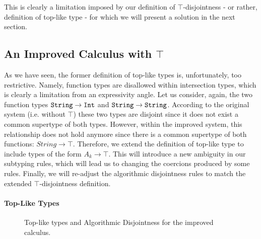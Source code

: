This is clearly a limitation imposed by our definition of $\top$-disjointness - or rather, definition of top-like type - 
for which we will present a solution in the next section.

\subsection{An Improved Calculus with $\top$}

As we have seen, the former definition of top-like types is, unfortunately, too restrictive.
Namely, function types are disallowed within intersection types, which is clearly a limitation from an expressivity
angle.
Let us consider, again, the two function types $\texttt{String} \to \texttt{Int}$ and $\texttt{String} \to \texttt{String}$. 
According to the original system (i.e. without $\top$) these two types are disjoint since it does not exist
a common supertype of both types. 
However, within the improved system, this relationship does not hold anymore since there is a common supertype of both
functions: $String \to \top$.
Therefore, we extend the definition of top-like type to include types of the form $A_k \to \top$.
This will introduce a new ambiguity in our subtyping rules, which will lead us to changing the coercions produced by some
rules.
Finally, we will re-adjust the algorithmic disjointness rules to match the extended $\top$-disjointness definition. 

\paragraph{Top-Like Types}

\begin{figure}[h]


  \caption{Top-like types and Algorithmic Disjointness for the improved calculus.}
  \label{fig:tltypesextdis}
\end{figure}

